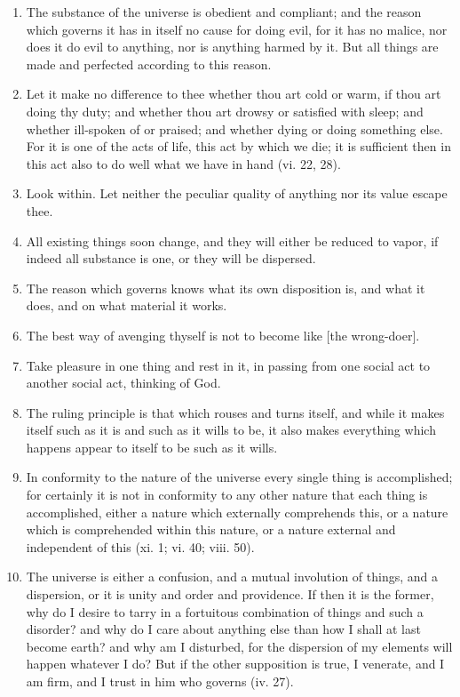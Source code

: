 \begin{enumerate}
\item The substance of the universe is obedient and compliant; and the reason which governs it has in itself no cause for doing evil, for it has no malice, nor does it do evil to anything, nor is anything harmed by it. But all things are made and perfected according to this reason.

\item Let it make no difference to thee whether thou art cold or warm, if thou art doing thy duty; and whether thou art drowsy or satisfied with sleep; and whether ill-spoken of or praised; and whether dying or doing something else. For it is one of the acts of life, this act by which we die; it is sufficient then in this act also to do well what we have in hand (vi. 22, 28).

\item Look within. Let neither the peculiar quality of anything nor its value escape thee.

\item All existing things soon change, and they will either be reduced to vapor, if indeed all substance is one, or they will be dispersed.

\item The reason which governs knows what its own disposition is, and what it does, and on what material it works.

\item The best way of avenging thyself is not to become like [{\clarify the wrong-doer}].

\item Take pleasure in one thing and rest in it, in passing from one social act to another social act, thinking of God.

\item The ruling principle is that which rouses and turns itself, and while it makes itself such as it is and such as it wills to be, it also makes everything which happens appear to itself to be such as it wills.

\item In conformity to the nature of the universe every single thing is accomplished; for certainly it is not in conformity to any other nature that each thing is accomplished, either a nature which externally comprehends this, or a nature which is comprehended within this nature, or a nature external and independent of this (xi. 1; vi. 40; viii. 50).

\item The universe is either a confusion, and a mutual involution of things, and a dispersion, or it is unity and order and providence. If then it is the former, why do I desire to tarry in a fortuitous combination of things and such a disorder? and why do I care about anything else than how I shall at last become earth? and why am I disturbed, for the dispersion of my elements will happen whatever I do? But if the other supposition is true, I venerate, and I am firm, and I trust in him who governs (iv. 27).


\end{enumerate}
